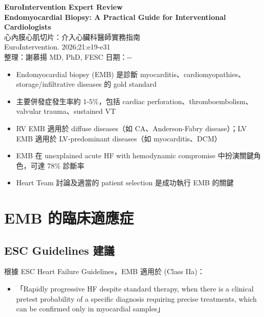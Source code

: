 \documentclass[12pt,a4paper]{article}
\newcommand{\keyfinding}[1]{
    \par
    \noindent
    \begin{tcolorbox}[
        colback=yellow!10!white,
        colframe=orange!75!black,
        title=\textbf{核心發現摘要},
        fonttitle=\bfseries,
        boxrule=0.5pt,
        arc=3pt
    ]
    #1
    \end{tcolorbox}
}
\newcommand{\mydate}{\the\year-\the\month-\the\day}
\begin{document}
\begin{center}
{\LARGE\bfseries\textcolor{emergency_red}{EuroIntervention Expert Review}}\\[0.5cm]
{\Large\textbf{Endomyocardial Biopsy: A Practical Guide for Interventional Cardiologists}}\\[0.3cm]
{\large 心內膜心肌切片：介入心臟科醫師實務指南}\\[0.5cm]
{\normalsize EuroIntervention. 2026;21:e19-e31}\\[0.3cm]
{\normalsize 整理：謝慕揚 MD, PhD, FESC \quad 日期：\mydate}
\end{center}

\vspace{0.5cm}

\keyfinding{
\begin{itemize}[leftmargin=*]
    \item Endomyocardial biopsy (EMB) 是診斷 myocarditis、cardiomyopathies、storage/infiltrative diseases 的 gold standard
    \item 主要併發症發生率約 1-5\%，包括 cardiac perforation、thromboembolism、valvular trauma、sustained VT
    \item RV EMB 適用於 diffuse diseases（如 CA、Anderson-Fabry disease）；LV EMB 適用於 LV-predominant diseases（如 myocarditis、DCM）
    \item EMB 在 unexplained acute HF with hemodynamic compromise 中扮演關鍵角色，可達 78\% 診斷率
    \item Heart Team 討論及適當的 patient selection 是成功執行 EMB 的關鍵
\end{itemize}
}

\section{EMB 的臨床適應症}

\subsection{ESC Guidelines 建議}

根據 ESC Heart Failure Guidelines，EMB 適用於 (Class IIa)：
\begin{itemize}
    \item 「Rapidly progressive HF despite standard therapy, when there is a clinical pretest probability of a specific diagnosis requiring precise treatments, which can be confirmed only in myocardial samples」
\end{itemize}
\end{document}
